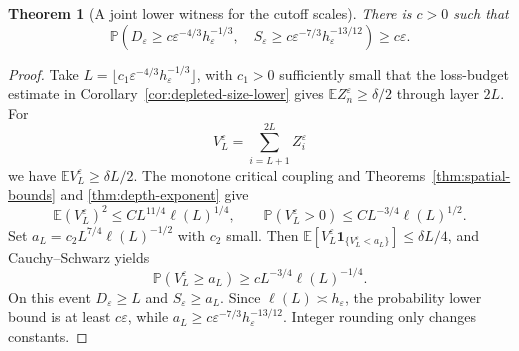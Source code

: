 \documentclass[11pt]{article}
\numberwithin{equation}{section}
\newtheorem{theorem}{Theorem}[section]
\theoremstyle{definition}
\newcommand{\E}{\mathbb E}
\newcommand{\Prob}{\mathbb P}
\newcommand{\ind}{\mathbf 1}
\begin{document}
\begin{theorem}[A joint lower witness for the cutoff scales]\label{thm:joint-cutoff-lower}
There is $c>0$ such that
\begin{equation}\label{eq:joint-cutoff-lower}
 \Prob\left(
 D_\varepsilon\ge c\varepsilon^{-4/3}h_\varepsilon^{-1/3},\quad
 S_\varepsilon\ge c\varepsilon^{-7/3}h_\varepsilon^{-13/12}
 \right)\ge c\varepsilon.
\end{equation}
\end{theorem}
\begin{proof}
Take $L=\lfloor c_1\varepsilon^{-4/3}h_\varepsilon^{-1/3}\rfloor$, with $c_1>0$ sufficiently small that the loss-budget estimate in Corollary~\ref{cor:depleted-size-lower} gives $\E Z_n^\varepsilon\ge\delta/2$ through layer $2L$. For
\[
 V_L^\varepsilon=\sum_{i=L+1}^{2L}Z_i^\varepsilon
\]
we have $\E V_L^\varepsilon\ge\delta L/2$. The monotone critical coupling and Theorems~\ref{thm:spatial-bounds} and \ref{thm:depth-exponent} give
\[
 \E(V_L^\varepsilon)^2\le C L^{11/4}\ell(L)^{1/4},\qquad
 \Prob(V_L^\varepsilon>0)\le C L^{-3/4}\ell(L)^{1/2}.
\]
Set $a_L=c_2L^{7/4}\ell(L)^{-1/2}$ with $c_2$ small. Then $\E[V_L^\varepsilon\ind_{\{V_L^\varepsilon<a_L\}}]\le\delta L/4$, and Cauchy--Schwarz yields
\[
 \Prob(V_L^\varepsilon\ge a_L)
 \ge c L^{-3/4}\ell(L)^{-1/4}.
\]
On this event $D_\varepsilon\ge L$ and $S_\varepsilon\ge a_L$. Since $\ell(L)\asymp h_\varepsilon$, the probability lower bound is at least $c\varepsilon$, while $a_L\ge c\varepsilon^{-7/3}h_\varepsilon^{-13/12}$. Integer rounding only changes constants.
\end{proof}
\end{document}
